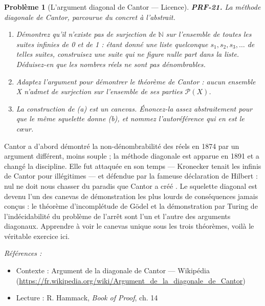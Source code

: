 \documentclass[11pt]{article}
\newtheorem{problem}{Problème}
\newenvironment{refs}{\par\small\noindent\emph{Références :}\begin{itemize}\setlength\itemsep{0pt}}{\end{itemize}\normalsize}
\begin{document}
\bigskip

\begin{problem}[{L'argument diagonal de Cantor --- Licence}]
\textbf{PRF-21.} La méthode diagonale de Cantor, parcourue du concret à
l'abstrait.
\begin{enumerate}
\item[(a)] Démontrez qu'il n'existe pas de surjection de $\mathbb{N}$ sur
l'ensemble de toutes les suites infinies de 0 et de 1 : étant donné une liste quelconque
$ s_1, s_2, s_3, \dots $ de telles suites, construisez une suite qui ne figure nulle part
dans la liste. Déduisez-en que les nombres réels ne sont pas dénombrables.
\item[(b)] Adaptez l'argument pour démontrer le théorème de Cantor : aucun
ensemble X n'admet de surjection sur l'ensemble de ses parties $ \mathcal{P}(X) $.
\item[(c)] La construction
de (a) est un canevas. Énoncez-la assez abstraitement pour que le même squelette donne (b),
et nommez l'autoréférence qui en est le c\oe{}ur.
\end{enumerate}

\end{problem}

\noindent Cantor a d'abord démontré la non-dénombrabilité des réels en 1874 par un
argument différent, moins souple ; la méthode diagonale est apparue en 1891 et a changé la
discipline. Elle fut attaquée en son temps --- Kronecker tenait les infinis de Cantor pour
illégitimes --- et défendue par la fameuse déclaration de Hilbert : \og{} nul ne doit nous chasser
du paradis que Cantor a créé \fg{}. Le squelette diagonal est devenu l'un des canevas de
démonstration les plus lourds de conséquences jamais conçus : le théorème d'incomplétude de
Gödel et la démonstration par Turing de l'indécidabilité du problème de l'arrêt sont l'un et
l'autre des arguments diagonaux. Apprendre à voir le canevas unique sous les trois théorèmes,
voilà le véritable exercice ici.

\begin{refs}
\item Contexte : Argument de la diagonale de Cantor --- Wikipédia (\url{https://fr.wikipedia.org/wiki/Argument_de_la_diagonale_de_Cantor})
\item Lecture : R. Hammack, \textit{Book of Proof}, ch. 14
\end{refs}

\bigskip
\end{document}
